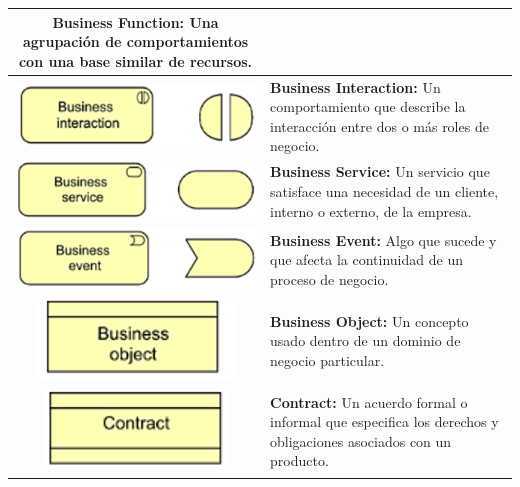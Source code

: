\begin{longtable}{|c|p{8cm}|}
	\textbf{Business Function:} Una agrupación de comportamientos con una base similar de recursos.                                      \\
	\hline
	\includegraphics{anexos/ARCHI/business/interaction.png}    &
	\textbf{Business Interaction:} Un comportamiento que describe la interacción entre dos o más roles de negocio.                       \\
	\hline
	\includegraphics{anexos/ARCHI/business/service.png}        &
	\textbf{Business Service:} Un servicio que satisface una necesidad de un cliente, interno o externo, de la empresa.                  \\
	\hline
	\includegraphics{anexos/ARCHI/business/event.png}          &
	\textbf{Business Event:} Algo que sucede y que afecta la continuidad de un proceso de negocio.                                       \\
	\hline
	\includegraphics{anexos/ARCHI/business/object.png}         &
	\textbf{Business Object:} Un concepto usado dentro de un dominio de negocio particular.                                              \\
	\hline
	\includegraphics{anexos/ARCHI/business/contract.png}       &
	\textbf{Contract:} Un acuerdo formal o informal que especifica los derechos y obligaciones asociados con un producto.                \\

\end{longtable}
